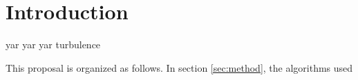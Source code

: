 \section{Introduction}

yar yar yar turbulence

This proposal is organized as follows. In section \ref{sec:method},
the algorithms used 